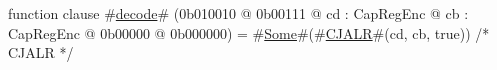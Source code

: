 function clause #\hyperref[sailMIPSzdecode]{decode}# (0b010010 @ 0b00111 @ cd : CapRegEnc @ cb : CapRegEnc @ 0b00000 @ 0b000000) = #\hyperref[sailMIPSzSome]{Some}#(#\hyperref[sailMIPSzCJALR]{CJALR}#(cd, cb, true)) /* CJALR */
